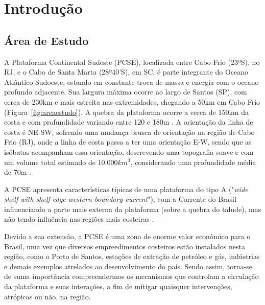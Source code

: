 \chapter{Introdução}
\label{anexoA}

\section{Área de Estudo}
\label{sec:studyArea}

\hspace{5mm}A Plataforma Continental Sudeste (PCSE), localizada entre Cabo Frio (23ºS), no RJ, e o Cabo de Santa Marta (28º40'S), em SC, é parte integrante do Oceano Atlântico Sudoeste,
estando em constante troca de massa e energia com o oceano profundo adjacente. Sua largura máxima ocorre ao largo de Santos (SP), com cerca de 230km e mais estreita nas extremidades,
chegando a 50km em Cabo Frio (Figura~\ref{fig:areaestudo}). A quebra da plataforma ocorre a cerca de 150km da costa e com profundidade variando entre 120 e 180m \citep{zembruscki1979geomorfologia}. A orientação da linha de costa é NE-SW, sofrendo uma mudança brusca de orientação na região de Cabo Frio (RJ), onde a linha de costa passa a ter uma orientação E-W, sendo que as isóbatas acompanham essa orientação, descrevendo uma topografia suave e com um volume total estimado de 10.000$km^3$, considerando uma profundidade média de 70m \citep{castro1996correntes}.

\hspace{5mm} A PCSE apresenta características típicas de uma plataforma do tipo A ("\textit{wide shelf with shelf-edge western boundary current}"), com a Corrente do Brasil influenciando a parte mais externa da plataforma (sobre a quebra do talude), mas não tendo influência nas regiões mais costeiras \citep{castro2014summer,loder1998western}.

\hspace{5mm} Devido a sua extensão, a PCSE é uma zona de enorme valor econômico para o Brasil, uma vez que diversos empreedimentos costeiros estão instalados nesta região, como o Porto de Santos, estações de extração de petróleo e gás, indústrias e demais exemplos atrelados ao desenvolvimento do país. Sendo assim, torna-se de suma importância compreendermos os mecanismos que controlam a circulação da plataforma e suas interações, a fim de mitigar quaisquer intervenções, atrópicas ou não, na região.

